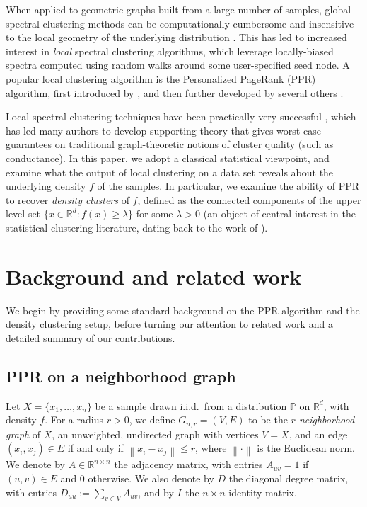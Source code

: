 \documentclass[11pt,twoside]{article}
\theoremstyle{definition}
\newcommand{\Reals}{\mathbb{R}}
\newcommand{\Rd}{\Reals^d}
\newcommand{\norm}[1]{\left\lVert#1\right\rVert}
\newcommand{\1}{\mathbbm{1}}
\newcommand{\Abf}{A}       %
\newcommand{\Xbf}{X}
\newcommand{\Dbf}{D}
\newcommand{\Ibf}[1]{I_{#1}}
\newcommand{\Pbb}{\mathbb{P}}
\begin{document}
When applied to geometric graphs built from a large number of samples, global
spectral clustering methods can be computationally cumbersome and insensitive to
the local geometry of the underlying distribution
\citep{leskovec2010,mahoney2012}.  This has led to increased interest in
\emph{local} spectral clustering algorithms, which leverage locally-biased
spectra computed using random walks around some user-specified seed node.  A
popular local clustering algorithm is the Personalized PageRank (PPR) algorithm,
first introduced by \citet{haveliwala2003}, and then further developed by
several others
\citep{spielman2011,spielman2014,andersen2006,mahoney2012,zhu2013}.  

Local spectral clustering techniques have been practically very successful
\citep{leskovec2010,andersen2012,gleich2012,mahoney2012,wu2012}, which has led
many authors to develop supporting theory
\citep{spielman2013,andersen2009,gharan2012,zhu2013} that gives worst-case
guarantees on traditional graph-theoretic notions of cluster quality (such as
conductance).  In this paper, we adopt a classical statistical viewpoint, and
examine what the output of local clustering on a data set reveals about the
underlying density $f$ of the samples.  In particular, we examine the ability of
PPR to recover \emph{density clusters} of $f$, defined as the connected
components of the upper level set $\{x \in \Rd : f(x) \geq \lambda\}$ for some
$\lambda > 0$ (an object of central interest in the statistical clustering
literature, dating back to the work of \citet{hartigan1981}). 

\section{Background and related work}

We begin by providing some standard background on the PPR algorithm
and the density clustering setup, before turning our attention to related work
and a detailed summary of our contributions.

\subsection{PPR on a neighborhood graph} 

Let $\Xbf = \{x_1,\ldots, x_n\}$ be a sample drawn i.i.d.\ from a distribution
$\Pbb$ on $\Rd$, with density $f$.  For a radius $r > 0$, we define
$G_{n,r}=(V,E)$ to be the \emph{$r$-neighborhood graph} of $\Xbf$, an
unweighted, undirected graph with vertices $V=\Xbf$, and an edge $(x_i,x_j) \in
E$ if and only if $\norm{x_i - x_j} \leq r$, where $\norm{\cdot}$ is the
Euclidean norm. We denote by $\Abf \in \Reals^{n \times n}$ the adjacency
matrix, with entries $\Abf_{uv} = 1$ if $(u,v) \in E$ and $0$ otherwise.  We
also denote by $\Dbf$ the diagonal degree matrix, with entries $\Dbf_{uu} :=
\sum_{v \in V} \Abf_{uv}$, and by $\Ibf{}$ the $n \times n$ identity matrix.
\end{document}
